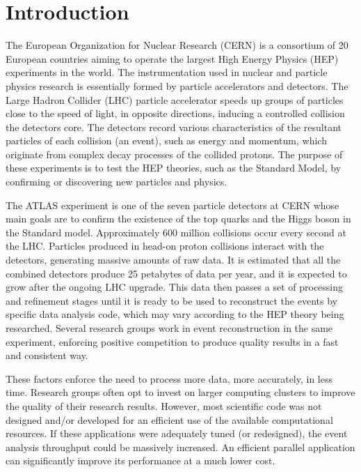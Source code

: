 \section{Introduction}
\label{introduction}

The European Organization for Nuclear Research (CERN) is a consortium of 20 European countries aiming to operate the largest High Energy Physics (HEP) experiments in the world. The instrumentation used in nuclear and particle physics research is essentially formed by particle accelerators and detectors. The Large Hadron Collider (LHC) particle accelerator speeds up groups of particles close to the speed of light, in opposite directions, inducing a controlled collision the detectors core. The detectors record various characteristics of the resultant particles of each collision (an event), such as energy and momentum, which originate from complex decay processes of the collided protons. The purpose of these experiments is to test the HEP theories, such as the Standard Model, by confirming or discovering new particles and physics.

The ATLAS experiment is one of the seven particle detectors at CERN whose main goals are to confirm the existence of the top quarks and the Higgs boson in the Standard model. Approximately 600 million collisions occur every second at the LHC. Particles produced in head-on proton collisions interact with the detectors, generating massive amounts of raw data. It is estimated that all the combined detectors produce 25 petabytes of data per year, and it is expected to grow after the ongoing LHC upgrade. This data then passes a set of processing and refinement stages until it is ready to be used to reconstruct the events by specific data analysis code, which may vary according to the HEP theory being researched. Several research groups work in event reconstruction in the same experiment, enforcing positive competition to produce quality results in a fast and consistent way.

These factors enforce the need to process more data, more accurately, in less time. Research groups often opt to invest on larger computing clusters to improve the quality of their research results. However, most scientific code was not designed and/or developed for an efficient use of the available computational resources. If these applications were adequately tuned (or redesigned), the event analysis throughput could be massively increased. An efficient parallel application can significantly improve its performance at a much lower cost.


